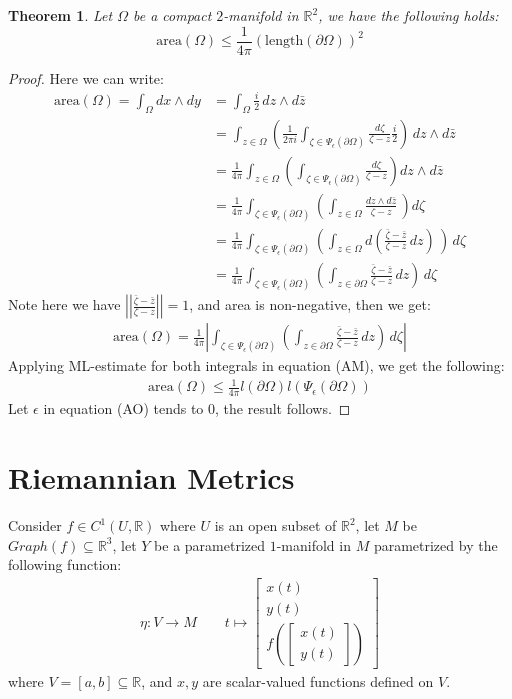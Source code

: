 \documentclass[15pt]{book}
\theoremstyle{break}
\theoremstyle{break}
\newtheorem{thm}{Theorem}[section]
\newcommand{\R}{\mathbb{R}}
\newcommand{\bmat}[1]{\begin{bmatrix} #1 \end{bmatrix}}
\begin{document}
\newpage
\begin{thm}
Let $\Omega$ be a compact $2$-manifold in $\R^2$, we have the following holds:
$$\text{area}(\Omega) \leq \frac{1}{4\pi}\left( \text{length}(\partial \Omega)\right)^2$$
\end{thm}
\begin{proof}
Here we can write:
\begin{align*}
\text{area}(\Omega) = \int_{\Omega} dx\wedge dy &= \int_{\Omega} \frac{i}{2}\, dz \wedge d\bar{z}\\
&= \int_{z \in \Omega}\left( \frac{1}{2\pi i}\int_{\zeta \in \Psi_{\epsilon}(\partial \Omega)} \frac{d\zeta}{\zeta - z} \frac{i}{2}\right)\, dz \wedge d\bar{z} \\
&= \frac{1}{4\pi}\int_{z\in \Omega}\left(\int_{\zeta \in \Psi_{\epsilon}(\partial \Omega)} \frac{d\zeta}{\zeta - z} \right) dz\wedge d\bar{z}\\
&= \frac{1}{4\pi}\int_{\zeta \in \Psi_{\epsilon}(\partial \Omega)}\left( \int_{z \in \Omega} \frac{dz \wedge d\bar{z}}{\zeta - z}\, \right)d\zeta \\
&= \frac{1}{4\pi}\int_{\zeta \in \Psi_{\epsilon}(\partial \Omega)}\left( \int_{z \in \Omega} d\left(\frac{\bar{\zeta}-\bar{z}}{\zeta - z}\,dz\right)\, \right)\,d\zeta \\
&= \frac{1}{4\pi} \int_{\zeta \in \Psi_\epsilon(\partial \Omega)} \left( \int_{z\in \partial\Omega} \frac{\bar{\zeta} - \bar{z}}{\zeta - z}\, dz\right)\, d\zeta
\end{align*}
Note here we have $\left|\left|\frac{\bar{\zeta} - \bar{z}}{\zeta - z} \right|\right|  = 1$, and area is non-negative, then we get:
\begin{align*}
\text{area}(\Omega) = \frac{1}{4\pi}\left| \int_{\zeta \in \Psi_\epsilon(\partial \Omega)} \left( \int_{z\in \partial\Omega} \frac{\bar{\zeta} - \bar{z}}{\zeta - z}\, dz\right)\, d\zeta \right| \tag{AM}
\end{align*}
Applying ML-estimate for both integrals in equation (AM), we get the following:
\begin{align*}
\text{area}(\Omega) \leq \frac{1}{4\pi} l(\partial \Omega) l(\Psi_{\epsilon} (\partial \Omega)) \tag{AO}
\end{align*}
Let $\epsilon$ in equation (AO) tends to $0$, the result follows.
\end{proof}

\newpage
\section[Riemannian Metrics]{\color{red}Riemannian Metrics\color{black}}
Consider $f \in C^1(U,\R)$ where $U$ is an open subset of $\R^2$, let $M$
be $Graph(f) \subseteq \R^3$, let $Y$ be a parametrized $1$-manifold in $M$ parametrized by the following function:
\begin{align*}
\eta: V \to M \qquad t\mapsto \bmat{x(t)\\ y(t) \\ f\left(\bmat{x(t)\\y(t)}\right)}
\end{align*}
where $V=[a,b]\subseteq \R$, and $x,y$ are scalar-valued functions defined on $V$.
\end{document}
